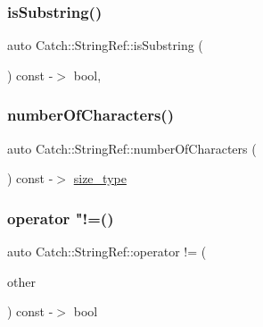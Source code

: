 \subsubsection{\texorpdfstring{isSubstring()}{isSubstring()}}
{\footnotesize\ttfamily auto Catch\+::\+String\+Ref\+::is\+Substring (\begin{DoxyParamCaption}{ }\end{DoxyParamCaption}) const -\/$>$  bool\hspace{0.3cm}{\ttfamily [private]}, {\ttfamily [noexcept]}}

\mbox{\label{class_catch_1_1_string_ref_a6a6cac7430e626ffdd7550a081e8168f}} 
\subsubsection{\texorpdfstring{numberOfCharacters()}{numberOfCharacters()}}
{\footnotesize\ttfamily auto Catch\+::\+String\+Ref\+::number\+Of\+Characters (\begin{DoxyParamCaption}{ }\end{DoxyParamCaption}) const -\/$>$  \mbox{\hyperlink{class_catch_1_1_string_ref_a06b4db8fc82b197004291cf370b2ba7c}{size\+\_\+type}}\hspace{0.3cm}{\ttfamily [noexcept]}}

\mbox{\label{class_catch_1_1_string_ref_afbd4abd62af0fc1a35697cbb91415fc6}} 
\subsubsection{\texorpdfstring{operator "!=()}{operator !=()}}
{\footnotesize\ttfamily auto Catch\+::\+String\+Ref\+::operator != (\begin{DoxyParamCaption}\item[{\mbox{\hyperlink{class_catch_1_1_string_ref}{String\+Ref}} const \&}]{other }\end{DoxyParamCaption}) const -\/$>$  bool\hspace{0.3cm}{\ttfamily [noexcept]}}

\mbox{\label{class_catch_1_1_string_ref_ad9fde21785affacc32d7da7a70d74e93}} 
